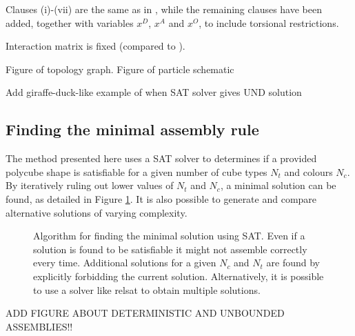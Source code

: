 Clauses (i)-(vii) are the same as in \cite{romano2020designing}, while the remaining clauses have been added, together with variables \(x^D\), \(x^A\) and \(x^O\), to include torsional restrictions.

Interaction matrix is fixed (compared to \cite{romano2020designing}).

Figure of topology graph. Figure of particle schematic

Add giraffe-duck-like example of when SAT solver gives UND solution

\subsection{Finding the minimal assembly rule}

The method presented here uses a SAT solver to determines if a provided polycube shape is satisfiable for a given number of cube types \(N_t\) and colours \(N_c\). By iteratively ruling out lower values of \(N_t\) and \(N_c\), a minimal solution can be found, as detailed in Figure \ref{fig:sat_alg}. It is also possible to generate and compare alternative solutions of varying complexity.

\begin{figure}
    \centering
    \resizebox{\textwidth}{!}{}
    \caption{Algorithm for finding the minimal solution using SAT. Even if a solution is found to be satisfiable it might not assemble correctly every time. Additional solutions for a given \(N_c\) and \(N_t\) are found by explicitly forbidding the current solution. Alternatively, it is possible to use a solver like relsat to obtain multiple solutions. }
    \label{fig:sat_alg}
\end{figure}
ADD FIGURE ABOUT DETERMINISTIC AND UNBOUNDED ASSEMBLIES!!

